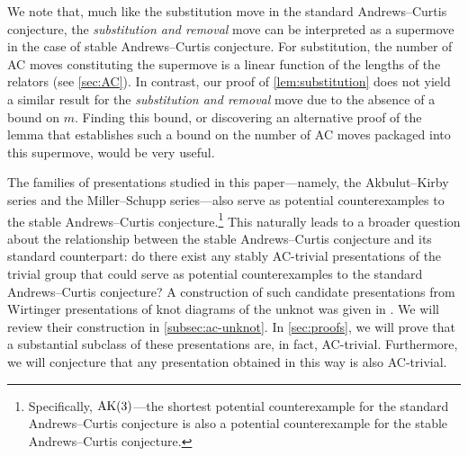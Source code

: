We note that, much like the substitution move in the standard Andrews--Curtis conjecture, the \emph{substitution and removal} move can be interpreted as a supermove in the case of stable Andrews--Curtis conjecture. For substitution, the number of AC moves constituting the supermove is a linear function of the lengths of the relators (see \cref{sec:AC}). In contrast, our proof of \cref{lem:substitution} does not yield a similar result for the \emph{substitution and removal} move due to the absence of a bound on $m$. Finding this bound, or discovering an alternative proof of the lemma that establishes such a bound on the number of AC moves packaged into this supermove, would be very useful.

The families of presentations studied in this paper---namely, the Akbulut--Kirby series and the Miller--Schupp series---also serve as potential counterexamples to the stable Andrews--Curtis conjecture.\footnote{Specifically, $\text{AK}(3)$---the shortest potential counterexample for the standard Andrews--Curtis conjecture is also a potential counterexample for the stable Andrews--Curtis conjecture.}
This naturally leads to a broader question about the relationship between the stable Andrews--Curtis conjecture and its standard counterpart: do there exist any stably AC-trivial presentations of the trivial group that could serve as potential counterexamples to the standard Andrews--Curtis conjecture? 
A construction of such candidate presentations from Wirtinger presentations of knot diagrams of the unknot was given in \cite{MMS}. We will review their construction in \cref{subsec:ac-unknot}. In \cref{sec:proofs}, we will prove that a substantial subclass of these presentations are, in fact, AC-trivial. 
Furthermore, we will conjecture that any presentation obtained in this way is also AC-trivial. 




